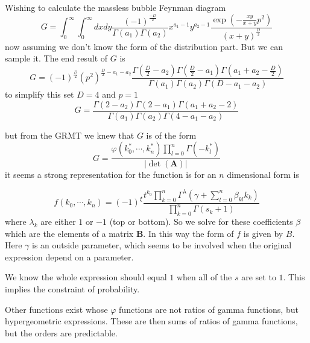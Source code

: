 \documentclass[journal=jcisd8,manuscript=article,layout=onecolumn,pdftex,floatfix,amsmath,amssymb,10pt]{achemso}
\begin{document}
Wishing to calculate the massless bubble Feynman diagram
$$
G = \int_0^\infty \int_0^\infty dx dy \frac{(-1)^\frac{-D}{2}}{\Gamma(a_1)\Gamma(a_2)} x^{a_1-1}y^{a_2-1} \frac{\exp(-\frac{x y}{x+y} p^2)}{(x+y)^\frac{D}{2}}
$$
now assuming we don't know the form of the distribution part. But we can sample it. The end result of $G$ is
$$
G = (-1)^\frac{D}{2}(p^2)^{\frac{D}{2}-a_1-a_2}\frac{\Gamma(\frac{D}{2}-a_2)\Gamma(\frac{D}{2}-a_1)\Gamma(a_1+a_2-\frac{D}{2})}{\Gamma(a_1)\Gamma(a_2)\Gamma(D-a_1-a_2)}
$$
to simplify this set $D=4$ and $p=1$
$$
G = \frac{\Gamma(2-a_2)\Gamma(2-a_1)\Gamma(a_1+a_2-2)}{\Gamma(a_1)\Gamma(a_2)\Gamma(4-a_1-a_2)}
$$



but from the GRMT we knew that $G$ is of the form
$$
G = \frac{\varphi(k_0^*,\cdots, k_n^*) \prod_{l=0}^n \Gamma(-k_l^*)}{|\det(\mathbf{A})|}
$$
it seems a strong representation for the function is for an $n$ dimensional form is

$$
f(k_0,\cdots,k_n)=(-1)^\xi \frac{t^{k_0}\prod_{k=0}^n \Gamma^\lambda\left(\gamma + \sum_{l=0}^n \beta_{kl}k_k\right)}{\prod_{k=0}^n \Gamma(s_k+1)}
$$
where $\lambda_k$ are either $1$ or $-1$ (top or bottom). So we solve for these coefficients $\beta$ which are the elements of a matrix $\mathbf{B}$. In this way the form of $f$ is given by $B$. Here $\gamma$ is an outside parameter, which seems to be involved when the original expression depend on a parameter.

We know the whole expression should equal $1$ when all of the $s$ are set to $1$. This implies the constraint of probability.

Other functions exist whose $\varphi$ functions are not ratios of gamma functions, but hypergeometric expressions. These are then sums of ratios of gamma functions, but the orders are predictable.
\end{document}
